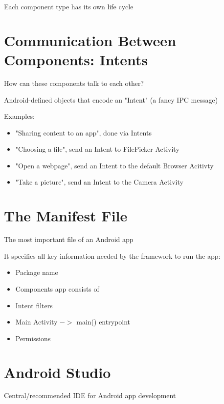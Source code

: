 \documentclass[11pt]{article}
\begin{document}
\begin{tcolorbox}[
  colback=orange!15,     %
  colframe=black!50,    %
  boxrule=1pt,       %
  arc=3mm,             %
  left=4mm, right=4mm, top=2mm, bottom=2mm %
]
Each component type has its own life cycle
\end{tcolorbox}

\section*{Communication Between Components: Intents}

How can these components talk to each other?

Android-defined objects that encode an "Intent" (a fancy IPC message)

Examples: 
\begin{itemize}
	\item "Sharing content to an app", done via Intents
	\item "Choosing a file", send an Intent to FilePicker Activity
	\item "Open a webpage", send an Intent to the default Browser Acitivty
	\item "Take a picture", send an Intent to the Camera Activity
\end{itemize}

\section*{The Manifest File}

The most important file of an Android app

It specifies all key information needed by the framework to run the app:

\begin{itemize}
	\item Package name
	\item Components app consists of
	\item Intent filters
	\item Main Activity $->$ main() entrypoint
	\item Permissions
\end{itemize}

\section*{Android Studio}

Central/recommended IDE for Android app development
\end{document}
